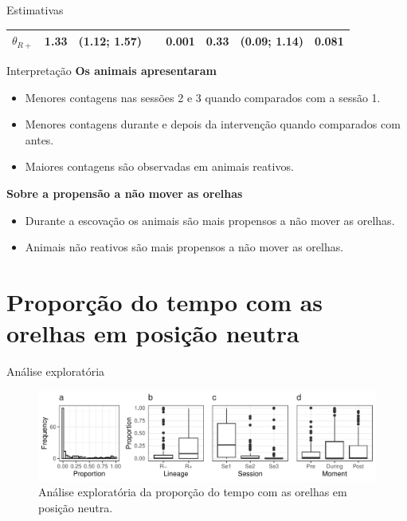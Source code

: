 \documentclass[
  ignorenonframetext,
  serif,
  professionalfont,
  usenames,
  dvipsnames,
  aspectratio = 169]{beamer}
\begin{document}
\begin{frame}{Estimativas}
\begin{table}[h]
\begin{tabular}{lcclccc}
        \multicolumn{1}{l|}{$\theta_{R+}$}   & {\color[HTML]{000000} 1.33}  & {\color[HTML]{000000} (1.12; 1.57)}   & \multicolumn{1}{l|}{{\color[HTML]{000000} \ \  0.001}} & {\color[HTML]{000000} 0.33}  & {\color[HTML]{000000} (0.09; 1.14)}   & {\color[HTML]{000000} 0.081}                                \\ \hline
    \end{tabular}
    \label{tab:est1}
\end{table}
\end{frame}

\begin{frame}{Interpretação}
\protect\hypertarget{interpretauxe7uxe3o}{}
\textbf{Os animais apresentaram }

\begin{itemize}
\item
  Menores contagens nas sessões 2 e 3 quando comparados com a sessão 1.
\item
  Menores contagens durante e depois da intervenção quando comparados
  com antes.
\item
  Maiores contagens são observadas em animais reativos.
\end{itemize}

\textbf{Sobre a propensão a não mover as orelhas}

\begin{itemize}
\item
  Durante a escovação os animais são mais propensos a não mover as
  orelhas.
\item
  Animais não reativos são mais propensos a não mover as orelhas.
\end{itemize}
\end{frame}

\hypertarget{proporuxe7uxe3o-do-tempo-com-as-orelhas-em-posiuxe7uxe3o-neutra}{%
\section{Proporção do tempo com as orelhas em posição
neutra}\label{proporuxe7uxe3o-do-tempo-com-as-orelhas-em-posiuxe7uxe3o-neutra}}

\begin{frame}{Análise exploratória}
\protect\hypertarget{anuxe1lise-exploratuxf3ria-1}{}
\begin{figure}

{\centering \includegraphics[width=0.95\linewidth]{./img/prop} 

}

\caption{Análise exploratória da proporção do tempo com as orelhas em posição neutra.}\label{fig:unnamed-chunk-12}
\end{figure}
\end{frame}
\end{document}

